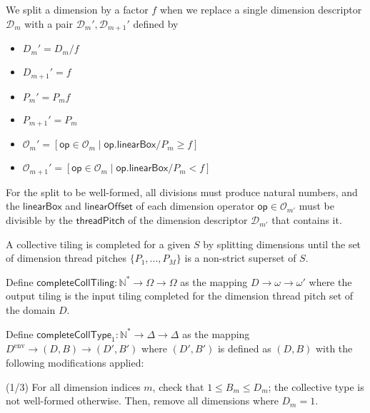 \filbreak
We split a dimension by a factor $f$ when we replace a single dimension descriptor $\mathcal{D}_m$ with a pair $\mathcal{D}_m', \mathcal{D}_{m+1}'$ defined by
\begin{itemize}
  \item $D_m' = D_m / f$
  \filbreak
  \item $D_{m+1}' = f$
  \filbreak
  \item $P_m' = P_m f$
  \filbreak
  \item $P_{m+1}' = P_m$
  \filbreak
  \item $\mathcal{O}_m' = [\mathsf{op} \in \mathcal{O}_m \mid \mathsf{op.linearBox} / P_m \ge f]$
  \filbreak
  \item $\mathcal{O}_{m+1}' = [\mathsf{op} \in \mathcal{O}_m \mid \mathsf{op.linearBox} / P_m < f]$
\end{itemize}
\filbreak
For the split to be well-formed, all divisions must produce natural numbers, and the $\mathsf{linearBox}$ and $\mathsf{linearOffset}$ of each dimension operator $\mathsf{op} \in \mathcal{O}_{m'}$ must be divisible by the $\mathsf{threadPitch}$ of the dimension descriptor $\mathcal{D}_{m'}$ that contains it.

\filbreak
A collective tiling is completed for a given  $S$ by splitting dimensions until the set of dimension thread pitches $\{P_1, ..., P_M\}$ is a non-strict superset of $S$.

\filbreak
Define $\mathsf{completeCollTiling}: \mathbb{N}^* \to \Omega \to \Omega$ as the mapping $D \to \omega \to \omega'$ where the output tiling is the input tiling completed for the dimension thread pitch set of the domain $D$.

\filbreak
{}

Define  $\mathsf{completeCollType}_1: \mathbb{N}^* \to \Delta \to \Delta$ as the mapping $D^\text{env} \to (D, B) \to (D', B')$ where $(D', B')$ is defined as $(D, B)$ with the following modifications applied:

\filbreak
(1/3) For all dimension indices $m$, check that $1 \le B_m \le D_m$; the collective type is not well-formed otherwise.
Then, remove all dimensions where $D_m = 1$.

